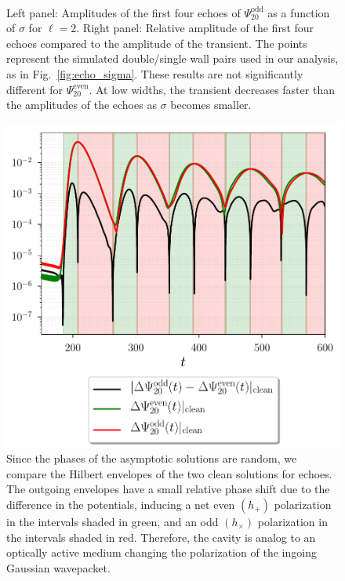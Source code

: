 \documentclass[article,aps,nofootinbib,twocolumn,superscriptaddress]{revtex4-1}
\begin{document}
\begin{figure}
\centering
{} \,
\caption{\label{fig:echo_sigma_odd} Left panel: Amplitudes of the first four echoes of $\Psi^{\mathrm{odd}}_{20}$ as a function of $\sigma$ for $\ell=2$. Right panel: Relative amplitude of the first four echoes compared to the amplitude of the transient. The points represent the simulated double/single wall pairs used in our analysis, as in Fig.~\ref{fig:echo_sigma}. These results are not significantly different for $\Psi^{\mathrm{even}}_{20}$. At low widths, the transient decreases faster than the amplitudes of the echoes as $\sigma$ becomes smaller.} 
\end{figure}

\begin{figure}[t!]
\centering
\includegraphics[width=.45\textwidth]{figures/Polarimetry_echo_w_06495.pdf}
\caption{\label{fig:pol} Since the phases of the asymptotic solutions are random, we compare the Hilbert envelopes of the two clean solutions for echoes. The outgoing envelopes have a small relative phase shift due to the difference in the potentials, inducing a net even $(h_+)$ polarization in the intervals shaded in green, and an odd $(h_{\times})$ polarization in the intervals shaded in red. Therefore, the cavity is analog to an optically active medium changing the polarization of the ingoing Gaussian wavepacket.}
\end{figure}
\end{document}
